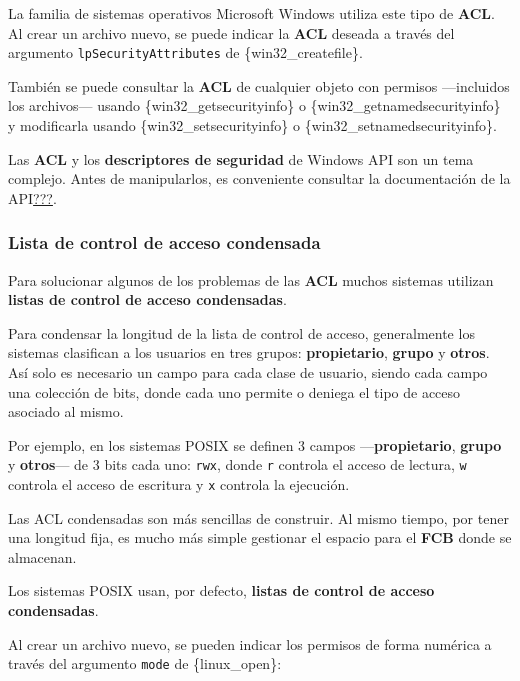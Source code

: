 La familia de sistemas operativos Microsoft Windows utiliza este tipo de
\textbf{ACL}. Al crear un archivo nuevo, se puede indicar la
\textbf{ACL} deseada a través del argumento
\texttt{lpSecurityAttributes} de \{win32\_createfile\}.

También se puede consultar la \textbf{ACL} de cualquier objeto con
permisos ---incluidos los archivos--- usando \{win32\_getsecurityinfo\}
o \{win32\_getnamedsecurityinfo\} y modificarla usando
\{win32\_setsecurityinfo\} o \{win32\_setnamedsecurityinfo\}.

Las \textbf{ACL} y los \textbf{descriptores de seguridad} de Windows API
son un tema complejo. Antes de manipularlos, es conveniente consultar la
documentación de la API\hyperref[Win32-SecurityDescriptors]{???}.

\subsubsection{Lista de control de acceso
condensada}\label{acl_condensada}

Para solucionar algunos de los problemas de las \textbf{ACL} muchos
sistemas utilizan \textbf{listas de control de acceso condensadas}{}.

Para condensar la longitud de la lista de control de acceso,
generalmente los sistemas clasifican a los usuarios en tres grupos:
\textbf{propietario}, \textbf{grupo} y \textbf{otros}. Así solo es
necesario un campo para cada clase de usuario, siendo cada campo una
colección de bits, donde cada uno permite o deniega el tipo de acceso
asociado al mismo.

Por ejemplo, en los sistemas POSIX se definen 3 campos
---\textbf{propietario}, \textbf{grupo} y \textbf{otros}--- de 3 bits
cada uno: \texttt{rwx}, donde \texttt{r} controla el acceso de lectura,
\texttt{w} controla el acceso de escritura y \texttt{x} controla la
ejecución.

Las ACL condensadas son más sencillas de construir. Al mismo tiempo, por
tener una longitud fija, es mucho más simple gestionar el espacio para
el \textbf{FCB} donde se almacenan.

Los sistemas POSIX usan, por defecto, \textbf{listas de control de
acceso condensadas}.

Al crear un archivo nuevo, se pueden indicar los permisos de forma
numérica a través del argumento \texttt{mode} de \{linux\_open\}:

\begin{Shaded}
\begin{Highlighting}[]
\OperatorTok{=}\OperatorTok{(}
    \OperatorTok{,}
\OperatorTok{|}\OperatorTok{,}
\OperatorTok{);}
\end{Highlighting}
\end{Shaded}

